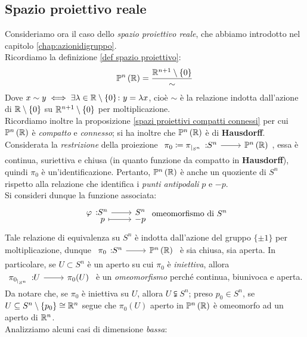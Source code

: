 \subsection{Spazio proiettivo reale}
Consideriamo ora il caso dello \textit{spazio proiettivo reale}, che abbiamo introdotto nel capitolo \autoref{chap:azionidigruppo}. \\
Ricordiamo la definizione \ref{def spazio proiettivo}:
\begin{equation*}
	\proj[n]{\realset}=\frac{\realset^{n+1}\setminus\{0\}}{\sim}
\end{equation*}
Dove $x\sim y \iff \exists\lambda\in\mathbb{R}\setminus\{0\} \colon y=\lambda x$, cioè $\sim$ è la relazione indotta dall'azione di $\mathbb{R}\setminus\{0\}$ su $\mathbb{R}^{n+1}\setminus\{0\}$ per moltiplicazione.\\
Ricordiamo inoltre la proposizione \ref{spazi proiettivi compatti connessi} per cui $\proj[n]{\realset}$ è \textit{compatto} e \textit{connesso}; si ha inoltre che $\proj[n]{\realset}$ è di \textbf{Hausdorff}.\\
Considerata la \textit{restrizione} della proiezione $\funz {\pi_0\coloneqq \pi_{\mid_{S^n}}} {S^n} {\proj[n]{\realset}}$, essa è continua, suriettiva e chiusa (in quanto funzione da compatto in \textbf{Hausdorff}), quindi $\pi_0$ è un'identificazione. Pertanto, $\proj[n]{\realset}$ è anche un quoziente di $S^n$ rispetto alla relazione che identifica i \textit{punti antipodali} $p$ e $-p$.\\
Si consideri dunque la funzione associata:
\begin{equation}
	\funztot \phi {S^n} {S^n} p {-p}\text{ omeomorfismo di }S^n
\end{equation}
Tale relazione di equivalenza su $S^n$ è indotta dall'azione del gruppo $\{\pm 1\}$ per moltiplicazione, dunque $\funz {\pi_0} {S^n} {\proj[n]{\realset}}$ è sia chiusa, sia aperta. In particolare, se $U\subset S^n$ è un aperto su cui $\pi_0$ è \textit{iniettiva}, allora $\funz {\pi_{0_{\mid_{S^n}}}} U {\pi_0(U)}$ è un \textit{omeomorfismo} perché continua, biunivoca e aperta.\\
Da notare che, se $\pi_0$ è iniettiva su $U$, allora $U\subsetneqq S^n$; preso $p_0\in S^n$, se $U\subseteq S^n\setminus\{p_0\}\cong\mathbb{R}^n$ segue che $\pi_0(U)$ aperto in $\proj[n]{\realset}$ è omeomorfo ad un aperto di $\mathbb{R}^n$.\\
Analizziamo alcuni casi di dimensione \textit{bassa}:
